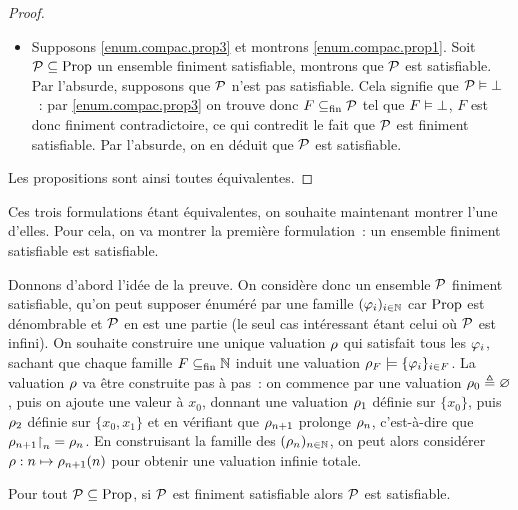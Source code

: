 \begin{proof}
\begin{itemize}
\begin{itemize}
      valuation serait une valuation de $F$, ce qui n'existe pas). Or,
      $\env\not\satisf \lnot \varFF$ signifie que $\env\satisf \varFF$, donc
      toute
      valuation $\env\satisf F'$ vérifie $\env\satisf \varFF$. On a donc trouvé
      $F'\subfin \PropSet$ telle que $F'\vD \varFF$.
    \end{itemize}
    Dans les deux cas, on a trouvé $F\subfin \PropSet$ telle que $F\vD \varFF$.
  \item Supposons \ref{enum.compac.prop3} et montrons \ref{enum.compac.prop1}.
    Soit $\mathcal P\subseteq\operatorname{Prop}$ un ensemble finiment satisfiable, montrons
    que $\mathcal P$ est satisfiable. Par l'absurde, supposons que $\mathcal P$
    n'est pas satisfiable. Cela signifie que $\mathcal P\vDash \bot$~: par
    \ref{enum.compac.prop3} on trouve donc $F\subfin \PropSet$ tel que
    $F\vDash \bot$, $F$ est donc finiment contradictoire, ce qui contredit le
    fait que $\mathcal P$ est finiment satisfiable. Par l'absurde, on en déduit
    que $\mathcal P$ est satisfiable.
  \end{itemize}

  Les propositions sont ainsi toutes équivalentes.
\end{proof}

Ces trois formulations étant équivalentes, on souhaite maintenant montrer l'une
d'elles. Pour cela, on va montrer la première formulation~: un ensemble finiment
satisfiable est satisfiable.

Donnons d'abord l'idée de la preuve. On considère donc un ensemble
$\mathcal P$ finiment satisfiable, qu'on peut supposer énuméré par une famille
$(\varphi_i)_{i \in \mathbb N}$ car $\operatorname{Prop}$ est dénombrable et $\mathcal P$ en est une
partie (le seul cas intéressant étant celui où $\mathcal P$ est infini). On
souhaite construire une unique valuation $\rho$ qui satisfait tous les
$\varphi_i$, sachant que chaque famille $F\subseteq_{\mathrm{fin}} \mathbb N$ induit une valuation
$\rho_F \models \{\varphi_i\}_{i \in F}$. La valuation $\rho$ va être construite
pas à pas~: on commence par une valuation $\rho_0 \triangleq \varnothing$, puis on
ajoute une valeur à $x_0$, donnant une valuation $\rho_1$ définie sur $\{x_0\}$,
puis $\rho_2$ définie sur $\{x_0,x_1\}$  et en vérifiant que
$\rho_{n+1}$ prolonge $\rho_n$, c'est-à-dire que $\rho_{n+1}\mathbin{\upharpoonright}_{n} = \rho_n$.
En construisant la famille des $(\rho_n)_{n \in \mathbb N}$, on peut alors considérer
$\rho : n \mapsto \rho_{n+1}(n)$ pour obtenir une valuation infinie totale.

\begin{theorem}\label{thm.compac.prop}
  Pour tout $\mathcal P\subseteq\operatorname{Prop}$, si $\mathcal P$ est finiment satisfiable
  alors $\mathcal P$ est satisfiable.
\end{theorem}

